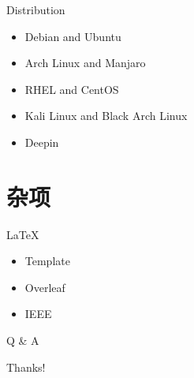 \documentclass{beamer}
\begin{document}
\begin{frame}{Distribution}
    \begin{itemize}
        \item Debian and Ubuntu
        \item Arch Linux and Manjaro
        \item RHEL and CentOS
        \item Kali Linux and Black Arch Linux
        \item Deepin
    \end{itemize}
\end{frame}




\section{杂项}


\begin{frame}{LaTeX}
    \begin{itemize}
        \item Template
        \item Overleaf
        \item IEEE
    \end{itemize}
\end{frame}

\begin{frame}{Q \& A}
    \begin{center}
        {\Huge\calligra Thanks!}
    \end{center}
\end{frame}
\end{document}
